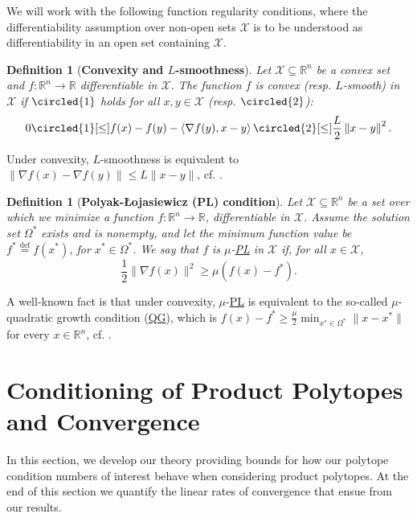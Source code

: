 \documentclass{article}
\makeatletter
\newcommand{\R}{\mathbb{R}}
\newcommand{\mX}{\mathcal{X}}
\newcommand{\innp}[1]{\left\langle #1 \right\rangle}
\newcommand{\norm}[1]{\| #1 \|}
\newcommand{\defi}{\stackrel{\mathrm{\scriptscriptstyle def}}{=}}
\newtheorem{definition}[theorem]{Definition}
\newcommand\newlink[2]{\hyperlink{#1}{\normalcolor #2}}
\newcommand\newtarget[2]{\Hy@raisedlink{\hypertarget{#1}{}}#2}
\newcommand{\PL}{\newlink{def:acronym_polyak_lojasiewicz}{PL}}
\newcommand{\QG}{\newlink{def:acronym_quadratic_growth}{QG}}
\makeatother
\begin{document}
We will work with the following function regularity conditions, where the differentiability assumption over non-open sets $\mX$ is to be understood as differentiability in an open set containing $\mX$.


\begin{definition}[\textbf{Convexity and $L$-smoothness}]\label{def:conv_smooth}
    Let $\mX \subseteq \R^n$ be a convex set and $f : \R^n \rightarrow \R$ differentiable in $\mX$. The function $f$ is convex (resp. $L$-smooth) in $\mX$ if $\circled{1}$ holds for all $x, y \in \mX$ (resp. $\circled{2}$):
\[
    0 \circled{1}[\leq] f(x) -  f(y) - \innp{\nabla f(y), x - y} \circled{2}[\leq] \frac{L}{2}\left\| x - y\right\|^2.
    \vspace{0.3cm}
\]
\end{definition}
Under convexity, $L$-smoothness is equivalent to $\|\nabla f(x) - \nabla f(y)\| \le L\|x - y\|$, cf. \cite{Bec17}.

\begin{definition}[\textbf{Polyak-\L{}ojasiewicz (PL) condition}]
\label{def:pl}
Let $\mX \subseteq \R^n$ be a set over which we minimize a function $f : \R^n \rightarrow \R$, differentiable in $\mX$.
Assume the solution set $\Omega^\ast$ exists and is nonempty, and let the minimum function value be $f^\ast \defi f(x^\ast)$, for $x^\ast \in \Omega^\ast$.
We say that $f$ is $\mu$-\PL{} in $\mX$ if, for all $x \in \mX$,
\[
\frac{1}{2} \|\nabla f(x)\|^2 \geq \mu (f(x) - f^\ast).
\]
\end{definition}

A well-known fact is that under convexity, $\mu$-\PL{} is equivalent to the so-called $\mu$-quadratic growth condition (\newtarget{def:acronym_quadratic_growth}{\QG{}}), which is $f(x) - f^\ast \geq \frac{\mu}{2}\min_{x^\ast\in\Omega^\ast }\norm{x-x^\ast}$ for every $x\in \R^n$, cf. \citep{KNS16}.
%
%
%
%
%
%
%
%
%
%
%
%
%
%
%
%
%
%
%
%
\section{Conditioning of Product Polytopes and Convergence}\label{s:premises}
In this section, we develop our theory providing bounds for how our polytope condition numbers of interest behave when considering product polytopes. At the end of this section we quantify the linear rates of convergence that ensue from our results.
\end{document}
